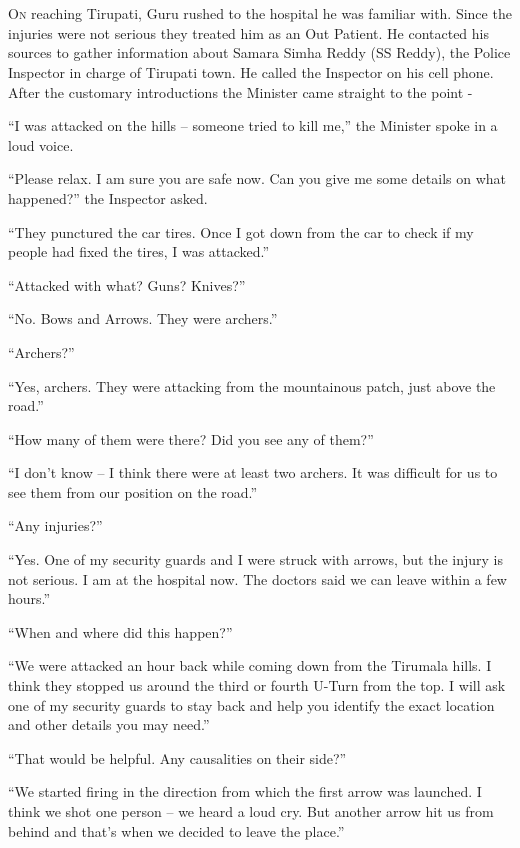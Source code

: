 \chapter{}

\lettrine{O}{n} reaching Tirupati, Guru rushed to the hospital he was familiar with. Since
the injuries were not serious they treated him as an Out Patient. He contacted
his sources to gather information about Samara Simha Reddy (SS Reddy), the
Police Inspector in charge of Tirupati town. He called the Inspector on his cell
phone. After the customary introductions the Minister came straight to the point
-

“I was attacked on the hills – someone tried to kill me,” the Minister spoke in
a loud voice.

“Please relax. I am sure you are safe now. Can you give me some details on what
happened?” the Inspector asked.

“They punctured the car tires. Once I got down from the car to check if my
people had fixed the tires, I was attacked.”

“Attacked with what? Guns? Knives?”

“No. Bows and Arrows. They were archers.”

“Archers?”

“Yes, archers. They were attacking from the mountainous patch, just above the
road.”

“How many of them were there? Did you see any of them?”

“I don't know – I think there were at least two archers. It was difficult for us
to see them from our position on the road.”

“Any injuries?”

“Yes. One of my security guards and I were struck with arrows, but the injury is
not serious. I am at the hospital now. The doctors said we can leave within a
few hours.”

“When and where did this happen?”

“We were attacked an hour back while coming down from the Tirumala hills. I
think they stopped us around the third or fourth U-Turn from the top. I will ask
one of my security guards to stay back and help you identify the exact location
and other details you may need.”

“That would be helpful. Any causalities on their side?”

“We started firing in the direction from which the first arrow was launched. I
think we shot one person – we heard a loud cry. But another arrow hit us from
behind and that's when we decided to leave the place.”

